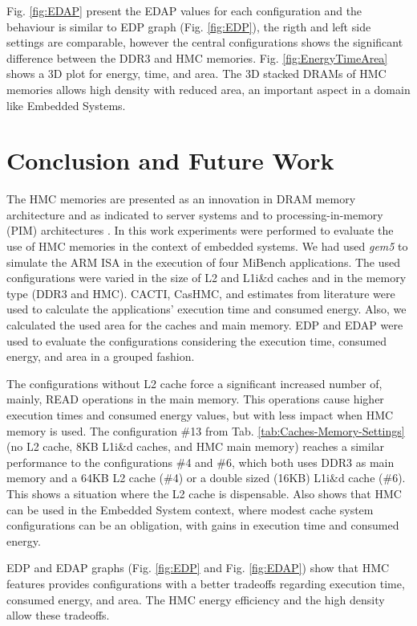 \documentclass{sig-alternate-05-2015}
\begin{document}
Fig. \ref{fig:EDAP} present the EDAP values for each configuration and the behaviour is similar to EDP graph (Fig. \ref{fig:EDP}), the rigth and left side settings are comparable, however the central configurations
shows the significant difference between the DDR3 and HMC memories. Fig. \ref{fig:EnergyTimeArea} shows a 3D plot for energy, time, and area. The 3D stacked DRAMs of HMC memories allows high density with reduced area, an important aspect in a domain like Embedded Systems.


\section{Conclusion and Future Work} \label{sec:Conclusion-and-Future}

The HMC memories are presented as an innovation in DRAM memory architecture \cite{hmc_Consortium} and as indicated to server systems and to processing-in-memory (PIM) architectures \cite{jeon2017cashmc}. In this work experiments were performed to evaluate the use of HMC memories in the context of embedded systems. We had used \emph{gem5} to simulate the ARM ISA in the execution of four MiBench applications. The used configurations were varied in the size of L2 and L1i\&d caches and in the memory type (DDR3 and HMC). CACTI, CasHMC, and estimates from literature were used to calculate the applications' execution time and consumed energy. Also, we calculated the used area for the caches and main memory. EDP and EDAP were used to evaluate the configurations considering the execution time, consumed energy, and area in a grouped fashion.

The configurations without L2 cache force a significant increased number of, mainly, READ operations in the main memory. This operations cause higher execution times and consumed energy values, but with less impact when HMC memory is used. The configuration \#13 from Tab. \ref{tab:Caches-Memory-Settings} (no L2 cache, 8KB L1i\&d caches, and HMC main memory) reaches a similar performance to the configurations \#4 and \#6, which both uses DDR3 as main memory and a 64KB L2 cache (\#4) or a double sized (16KB) L1i\&d cache (\#6). This shows a situation where the L2 cache is dispensable. Also shows that HMC can be used in the Embedded System context, where modest cache system configurations can be an obligation, with gains in execution time and consumed energy.

EDP and EDAP graphs (Fig. \ref{fig:EDP} and Fig. \ref{fig:EDAP}) show that HMC features provides configurations with a better tradeoffs regarding execution time, consumed energy, and area. The HMC energy efficiency and the high density allow these tradeoffs.
\end{document}
